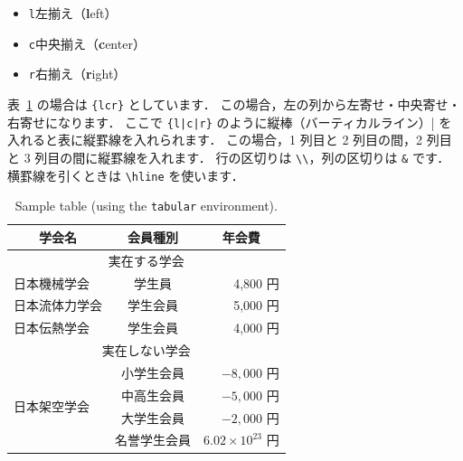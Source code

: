 \documentclass[
    paper=a4paper,      %
    article,            %
    fontsize=11pt,      %
    jafontsize=11pt,    %
    head_space=25mm,    %
    foot_space=25mm,    %
    gutter=20mm,        %
    fore-edge=20mm      %
    ]{jlreq}            %
\begin{document}
\begin{itemize}
    \item \verb|l|\quad 左揃え（\textbf{l}eft）
    \item \verb|c|\quad 中央揃え（\textbf{c}enter）
    \item \verb|r|\quad 右揃え（\textbf{r}ight）
\end{itemize}

表~\ref{table:tabular} の場合は \texttt{\{lcr\}} としています．
この場合，左の列から左寄せ・中央寄せ・右寄せになります．
ここで \texttt{\{l|c|r\}} のように縦棒（バーティカルライン）\verb||| を入れると表に縦罫線を入れられます．
この場合，1 列目と 2 列目の間，2 列目と 3 列目の間に縦罫線を入れます．
行の区切りは \verb|\\|，列の区切りは \verb|&| です．
横罫線を引くときは \verb|\hline| を使います．

\begin{table}[t]
    \centering
    \caption{Sample table (using the \texttt{tabular} environment).}
    \label{table:tabular}
    \begin{tabular}{lcr} \hline\hline
        \multicolumn{1}{c}{学会名}  & 会員種別  & \multicolumn{1}{c}{年会費} \\ \hline
        \multicolumn{3}{c}{実在する学会} \\ \hline
        日本機械学会    & 学生員    & 4,800 円 \\ \hline
        日本流体力学会  & 学生会員  & 5,000 円 \\ \hline
        日本伝熱学会    & 学生会員  & 4,000 円 \\ \hline
        \multicolumn{3}{c}{実在しない学会} \\ \hline
        \multirow{4}{*}{日本架空学会}& 小学生会員  & $-8,000$ 円 \\ \cline{2-3}
        & 中高生会員  & $-5,000$ 円 \\ \cline{2-3}
        & 大学生会員  & $-2,000$ 円 \\ \cline{2-3}
        & 名誉学生会員  & $6.02 \times 10^{23}$ 円 \\ \hline
    \end{tabular}
\end{table}
\end{document}
